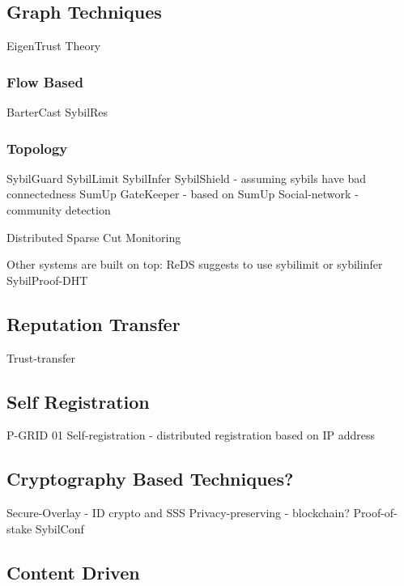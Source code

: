 \subsection{Graph Techniques}\label{sec:graph}
EigenTrust\cite{kamvar2003eigentrust}
Theory\cite{seuken2011sybil}

\subsubsection{Flow Based}
BarterCast\cite{meulpolder2009bartercast}
SybilRes\cite{delaviz2012sybilres}

\subsubsection{Topology}
SybilGuard\cite{yu2006sybilguard}
SybilLimit\cite{yu2008sybillimit}
SybilInfer\cite{danezis2009sybilinfer}
SybilShield\cite{shi2013sybilshield} - assuming sybils have bad connectedness
SumUp\cite{tran2009sybil}
GateKeeper\cite{tran2011optimal} - based on SumUp
Social-network\cite{viswanath2010analysis} - community detection

Distributed Sparse Cut Monitoring\cite{}

Other systems are built on top:
ReDS\cite{akavipat2014reds} suggests to use sybilimit or sybilinfer
SybilProof-DHT\cite{lesniewski2010whanau}
\subsection{Reputation Transfer}
Trust-transfer\cite{seigneur2005trust}

\subsection{Self Registration}
P-GRID 01\cite{aberer2001p}
Self-registration\cite{dinger2006defending} - distributed registration based on IP address

\subsection{Cryptography Based Techniques?}
Secure-Overlay\cite{lua2007securing} - ID crypto and SSS
Privacy-preserving\cite{schaub2016trustless} - blockchain?
Proof-of-stake\cite{dennis2016rep}
SybilConf\cite{tegeler2010sybilconf}

\subsection{Content Driven}
\cite{chatterjee2008robust}

